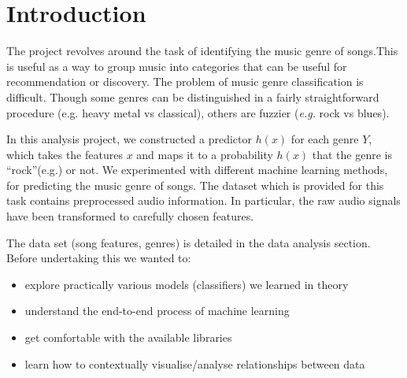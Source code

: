 \documentclass[fleqn,10pt]{SelfArx} %
\affiliation{\textsuperscript{}\textit{}} %
\affiliation{\textsuperscript{}\textit{}} %
\begin{document}
\boldmath

\flushbottom %

\maketitle %
\tableofcontents %
\thispagestyle{empty} %


\section{Introduction} %


The project revolves around the task of identifying the music genre of songs.This is useful as a way to group music into categories that can be useful for recommendation or discovery. The problem of music genre classification is difficult. Though some genres can be distinguished in a fairly straightforward procedure (e.g. heavy metal vs classical), others are fuzzier (\textit{e.g.} rock vs blues).

In this analysis project, we constructed a predictor $h(x)$ for each genre $Y$, which takes the features $x$ and maps it to a probability $h(x)$ that the genre is \textquotedblleft rock\textquotedblright (e.g.) or not. We experimented with different machine learning methods, for predicting the music genre of songs. The dataset which is provided for this task contains preprocessed audio information. In particular, the raw audio signals have been transformed to carefully chosen features.

The data set (song features, genres) is detailed in the data analysis section. Before undertaking this we wanted to:
\begin{itemize}
	\item explore practically various models (classifiers) we learned in theory
	\item understand the end-to-end process of machine learning
	\item get comfortable with the available libraries
	\item learn how to contextually visualise/analyse relationships between data
\end{itemize}
\end{document}
